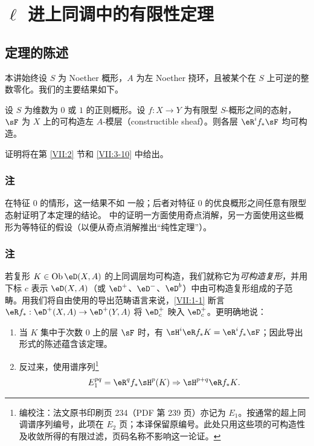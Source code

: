 
\chapter[{\texorpdfstring{$\ell$}{l} 进上同调中的有限性定理 [Th. finitude]}]{\texorpdfstring{$\ell$}{l} 进上同调中的有限性定理}\label{VII}

\section{定理的陈述}\label{VII:1}

本讲始终设 $S$ 为 Noether 概形，$A$ 为左 Noether 挠环，且被某个在 $S$ 上可逆的整数零化。我们的主要结果如下。

\begin{theorem_}\label{VII:1-1}
设 $S$ 为维数为 $0$ 或 $1$ 的正则概形。设 $f:X\to Y$ 为有限型 $S$-概形之间的态射，$\sF$ 为 $X$ 上的可构造左 $A$-模层（constructible sheaf）。则各层 $\eR^i f_\ast \sF$ 均可构造。
\end{theorem_}

证明将在第 \ref{VII:2} 节和 \ref{VII:3-10} 中给出。

\subsection{注}\label{VII:1-2}

在特征 $0$ 的情形，这一结果不如 \cite[XIX paragraphe 5]{sga4} 一般；后者对特征 $0$ 的优良概形之间任意有限型态射证明了本定理的结论。\cite[XIX]{sga4} 中的证明一方面使用奇点消解，另一方面使用这些概形为等特征的假设（以便从奇点消解推出“纯性定理”）。

\subsection{注}\label{VII:1-3}

若复形 $K\in\ob\eD(X,A)$ 的上同调层均可构造，我们就称它为\emph{可构造复形}，并用下标 $c$ 表示 $\eD(X,A)$（或 $\eD^+$、$\eD^-$、$\eD^b$）中由可构造复形组成的子范畴。用我们将自由使用的导出范畴语言来说，\ref{VII:1-1} 断言 $\eR f_\ast:\eD^+(X,A) \to \eD^+(Y,A)$ 将 $\eD_c^+$ 映入 $\eD_c^+$。更明确地说：
\begin{enumerate}[\indent a)]
  \item 当 $K$ 集中于次数 $0$ 上的层 $\sF$ 时，有 $\sH^i\eR f_\ast K = \eR^i f_\ast \sF$；因此导出形式的陈述蕴含该定理。
  \item 反过来，使用谱序列\footnote{编校注：法文原书印刷页 234（PDF 第 239 页）亦记为 $E_1$。按通常的超上同调谱序列编号，此项在 $E_2$ 页；本译保留原编号。此处只用这些项的可构造性及收敛所得的有限过滤，页码名称不影响这一论证。}
    \[
      E_1^{p q} = \eR^q f_\ast \sH^p(K) \Rightarrow \sH^{p+q} \eR f_\ast K \text{.}
    \]
\end{enumerate}

